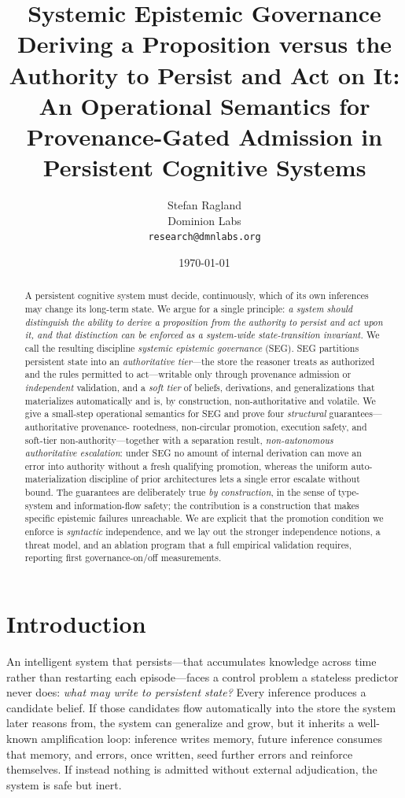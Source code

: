 \documentclass[11pt]{article}
\title{\textbf{Systemic Epistemic Governance}\\[2pt]
\large Deriving a Proposition versus the Authority to Persist and Act on It:\\
An Operational Semantics for Provenance-Gated Admission in Persistent Cognitive Systems}
\author{Stefan Ragland\\ Dominion Labs\\ \texttt{research@dmnlabs.org}}
\date{\today}
\theoremstyle{plain}
\theoremstyle{definition}
\begin{document}
\maketitle

\begin{abstract}
A persistent cognitive system must decide, continuously, which of its own
inferences may change its long-term state. We argue for a single principle:
\emph{a system should distinguish the ability to derive a proposition from the
authority to persist and act upon it, and that distinction can be enforced as a
system-wide state-transition invariant.} We call the resulting discipline
\emph{systemic epistemic governance} (SEG). SEG partitions persistent state into
an \emph{authoritative tier}---the store the reasoner treats as authorized and
the rules permitted to act---writable only through provenance admission or
\emph{independent} validation, and a \emph{soft tier} of beliefs, derivations,
and generalizations that materializes automatically and is, by construction,
non-authoritative and volatile. We give a small-step operational semantics for
SEG and prove four \emph{structural} guarantees---authoritative provenance-%
rootedness, non-circular promotion, execution safety, and soft-tier
non-authority---together with a separation result, \emph{non-autonomous
authoritative escalation}: under SEG no amount of internal derivation can move an
error into authority without a fresh qualifying promotion, whereas the uniform
auto-materialization discipline of prior architectures lets a single error
escalate without bound. The guarantees are deliberately true \emph{by
construction}, in the sense of type-system and information-flow safety; the
contribution is a construction that makes specific epistemic failures
unreachable. We are explicit that the promotion condition we enforce is
\emph{syntactic} independence, and we lay out the stronger independence notions,
a threat model, and an ablation program that a full empirical validation
requires, reporting first governance-on/off measurements.
\end{abstract}

\section{Introduction}

An intelligent system that persists---that accumulates knowledge across time
rather than restarting each episode---faces a control problem a stateless
predictor never does: \emph{what may write to persistent state?} Every inference
produces a candidate belief. If those candidates flow automatically into the
store the system later reasons from, the system can generalize and grow, but it
inherits a well-known amplification loop: inference writes memory, future
inference consumes that memory, and errors, once written, seed further errors and
reinforce themselves. If instead nothing is admitted without external
adjudication, the system is safe but inert.
\end{document}
